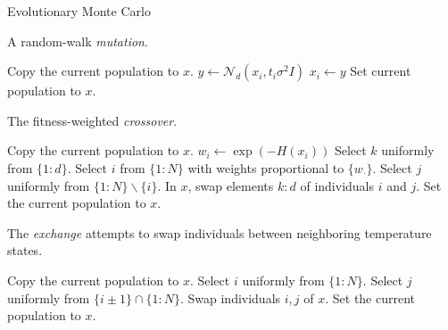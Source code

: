 \documentclass[12pt]{article}\usepackage[]{graphicx}\usepackage[]{color}
\begin{document}
\begin{algorithm}
  \caption{Evolutionary Monte Carlo}
  \label{alg:emc}
  \footnotesize
  \begin{algorithmic}
      \State {} \Ow \State {}
    \EndWp
    \State {}
    \EndProcedure
\end{algorithmic}
\end{algorithm}


\begin{algorithm}
  \caption{A random-walk \emph{mutation}.}
  \label{alg:mutate}
  \footnotesize
  \begin{algorithmic}
   \State Copy the current population to $x$.   \State $y \gets \mathcal N_d(x_i,t_i \sigma^2I)$  \State $x_i \gets y$
    \EndWp
    \EndFor
    \State Set current population to $x$.
    \EndProcedure
\end{algorithmic}
\end{algorithm}

\begin{algorithm}
  \caption{The fitness-weighted \emph{crossover}.}
  \label{alg:crossover}
  \footnotesize
  \begin{algorithmic}
   \State Copy the current population to $x$.   \State $w_i \gets \exp(-H(x_i))$
    \EndFor
    \State Select $k$ uniformly from $\{1\colon d\}.$ \State Select $i$ from $\{1\colon N\}$ with weights proportional to $\{w_\cdot\}$.  \State Select $j$ uniformly from $\{1\colon N\} \backslash \{i\}.$ \State In $x$, swap elements $k\colon d$ of individuals $i$ and $j$.   \State Set the current population to $x$.
    \EndWp
    \EndProcedure
\end{algorithmic}
\end{algorithm}

\begin{algorithm}
  \caption{The \emph{exchange} attempts to swap individuals between neighboring temperature states.}
  \label{alg:exchange}
  \footnotesize
  \begin{algorithmic}
   \State Copy the current population to $x$.  \State Select $i$ uniformly from $\{1\colon N\}$.  \State Select $j$ uniformly from $\{i\pm 1\}\cap\{1\colon N\}$.  \State Swap individuals $i,j$ of $x$.   \State Set the current population to $x$.
    \EndWp
    \EndProcedure
\end{algorithmic}
\end{algorithm}
\end{document}
